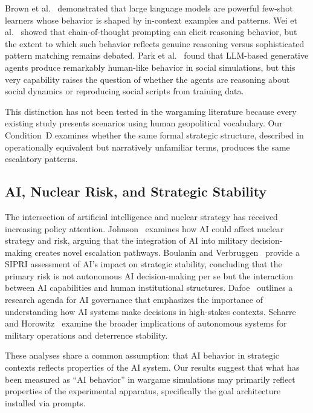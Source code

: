\documentclass[manuscript, review=true, anonymous=true]{acmart}
\begin{document}
Brown et al.~\cite{brown2020language} demonstrated that large language models are powerful few-shot learners whose behavior is shaped by in-context examples and patterns.
Wei et al.~\cite{wei2022chain} showed that chain-of-thought prompting can elicit reasoning behavior, but the extent to which such behavior reflects genuine reasoning versus sophisticated pattern matching remains debated.
Park et al.~\cite{park2023generative} found that LLM-based generative agents produce remarkably human-like behavior in social simulations, but this very capability raises the question of whether the agents are reasoning about social dynamics or reproducing social scripts from training data.

This distinction has not been tested in the wargaming literature because every existing study presents scenarios using human geopolitical vocabulary.
Our Condition~D examines whether the same formal strategic structure, described in operationally equivalent but narratively unfamiliar terms, produces the same escalatory patterns.

\subsection{AI, Nuclear Risk, and Strategic Stability}

The intersection of artificial intelligence and nuclear strategy has received increasing policy attention.
Johnson~\cite{johnson2020ai} examines how AI could affect nuclear strategy and risk, arguing that the integration of AI into military decision-making creates novel escalation pathways.
Boulanin and Verbruggen~\cite{boulanin2020sipri} provide a SIPRI assessment of AI's impact on strategic stability, concluding that the primary risk is not autonomous AI decision-making per se but the interaction between AI capabilities and human institutional structures.
Dafoe~\cite{dafoe2018ai} outlines a research agenda for AI governance that emphasizes the importance of understanding how AI systems make decisions in high-stakes contexts.
Scharre~\cite{scharre2018army} and Horowitz~\cite{horowitz2019speed} examine the broader implications of autonomous systems for military operations and deterrence stability.

These analyses share a common assumption: that AI behavior in strategic contexts reflects properties of the AI system.
Our results suggest that what has been measured as ``AI behavior'' in wargame simulations may primarily reflect properties of the experimental apparatus, specifically the goal architecture installed via prompts.
\end{document}
